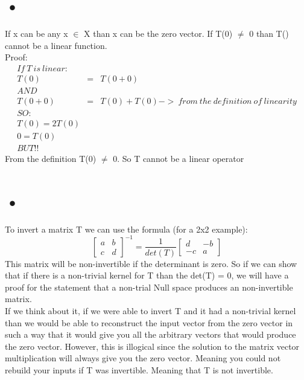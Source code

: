 \documentclass[12pt]{article}
\begin{document}
\section{•}
If x can be any x $\in$ X than x can be the zero vector. If T(0) $\not =$ 0 than T() cannot be a linear function.\\ 
Proof:\\
\begin{eqnarray*}
If\ T\ is\ linear:\\
T(0) &=& T(0+0)\\
AND\\
T(0+0) &=& T(0) + T(0) ->\ from\ the\ definition\ of\ linearity\\
SO:\\
T(0) = 2T(0)\\
0 = T(0)\\
BUT!!
\end{eqnarray*}
From the definition T(0) $\not =$ 0. So T cannot be a linear operator

\section{•}
To invert a matrix T we can use the formula (for a 2x2 example):
\[
\begin{bmatrix}
a & b\\
c & d
\end{bmatrix}
^{-1}
=
\frac{1}{det(T)}
\begin{bmatrix}
d & -b\\
-c & a
\end{bmatrix}
\]
This matrix will be non-invertible if the determinant is zero. So if we can show that if there is a non-trivial kernel for T than the det(T) = 0, we will have a proof for the statement that a non-trial Null space produces an non-invertible matrix.\\

If we think about it, if we were able to invert T and it had a non-trivial kernel than we would be able to reconstruct the input vector from the zero vector in such a way that it would give you all the arbitrary vectors that would produce the zero vector. However, this is illogical since the solution to the matrix vector multiplication will always give you the zero vector. Meaning you could not rebuild your inputs if T was invertible. Meaning that T is not invertible. 
\end{document}
